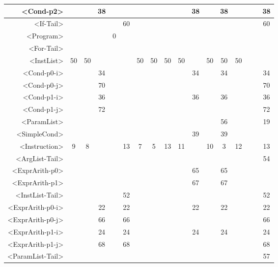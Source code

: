 \begin{tabular}{r|c@{ }c@{ }c@{ }c@{ }c@{ }c@{ }c@{ }c@{ }c@{ }c@{ }c@{ }c@{ }c@{ }c@{ }c@{ }c@{ }}
<Cond-p2> &   &   & 38 &   &   &   &   &   &   & 38 &   & 38 &   &   &   & 38 \\\hline
<If-Tail> &   &   &   &   & 60 &   &   &   &   &   &   &   &   &   &   & 60 \\\hline
<Program> &   &   &   & 0 &   &   &   &   &   &   &   &   &   &   &   &   \\\hline
<For-Tail> &   &   &   &   &   &   &   &   &   &   &   &   &   &   &   &   \\\hline
<InstList> & 50 & 50 &   &   &   & 50 & 50 & 50 & 50 &   & 50 & 50 & 50 &   &   &   \\\hline
<Cond-p0-i> &   &   & 34 &   &   &   &   &   &   & 34 &   & 34 &   &   &   & 34 \\\hline
<Cond-p0-j> &   &   & 70 &   &   &   &   &   &   &   &   &   &   &   &   & 70 \\\hline
<Cond-p1-i> &   &   & 36 &   &   &   &   &   &   & 36 &   & 36 &   &   &   & 36 \\\hline
<Cond-p1-j> &   &   & 72 &   &   &   &   &   &   &   &   &   &   &   &   & 72 \\\hline
<ParamList> &   &   &   &   &   &   &   &   &   &   &   & 56 &   &   &   & 19 \\\hline
<SimpleCond> &   &   &   &   &   &   &   &   &   & 39 &   & 39 &   &   &   &   \\\hline
<Instruction> & 9 & 8 &   &   & 13 & 7 & 5 & 13 & 11 &   & 10 & 3 & 12 &   &   & 13 \\\hline
<ArgList-Tail> &   &   &   &   &   &   &   &   &   &   &   &   &   &   &   & 54 \\\hline
<ExprArith-p0> &   &   &   &   &   &   &   &   &   & 65 &   & 65 &   &   &   &   \\\hline
<ExprArith-p1> &   &   &   &   &   &   &   &   &   & 67 &   & 67 &   &   &   &   \\\hline
<InstList-Tail> &   &   &   &   & 52 &   &   &   &   &   &   &   &   &   &   & 52 \\\hline
<ExprArith-p0-i> &   &   & 22 &   & 22 &   &   &   &   & 22 &   & 22 &   &   &   & 22 \\\hline
<ExprArith-p0-j> &   &   & 66 &   & 66 &   &   &   &   &   &   &   &   &   &   & 66 \\\hline
<ExprArith-p1-i> &   &   & 24 &   & 24 &   &   &   &   & 24 &   & 24 &   &   &   & 24 \\\hline
<ExprArith-p1-j> &   &   & 68 &   & 68 &   &   &   &   &   &   &   &   &   &   & 68 \\\hline
<ParamList-Tail> &   &   &   &   &   &   &   &   &   &   &   &   &   &   &   & 57 \\\hline
\end{tabular}



